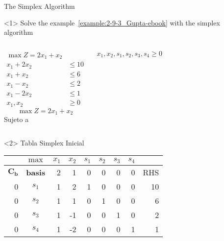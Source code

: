 \begin{frameExample}{The Simplex Algorithm}{}
  \begin{onlyenv}<1>
Solve the example~\ref{example:2-9-3_Gupta-ebook} with the simplex algorithm
  \begin{columns}
        \begin{align*}
      \max Z = 2x_1 + x_2 & \\[3mm]
    x_1 + 2x_2 & \leq 10\\
    x_1 + x_2 & \leq 6\\
    x_1 - x_2 & \leq 2\\
    x_1 - 2x_2 & \leq 1\\[5mm]
    x_1, x_2 & \geq 0
        \end{align*}
        \[ \max Z = 2x_1 + x_2 \]
      Sujeto a %

$x_1, x_2, s_1, s_2, s_3, s_4  \geq 0$
  \end{columns}
  \end{onlyenv}


\begin{onlyenv}<2>
  Tabla Simplex Inicial
  
  {\centering
\begin{tabular}{rc|rr|rrrr|r}
  &$\max$  & $x_1$ & $x_2$ & $s_1$ &$ s_2$ & $s_3$ & $s_4$ &  \\
  \toprule
  $\mathbf{C_b}$ & \textbf{basis} & 2 & 1 & 0 & 0 & 0 & 0 & RHS \\
  \midrule
0 & $s_1$ & 1 & 2 & 1 & 0 & 0 & 0 & 10 \\
0 & $s_2$ & 1 & 1 & 0 & 1 & 0 & 0 & 6 \\
0 & $s_3$ & 1 & -1 & 0 & 0 & 1 & 0 & 2 \\
  0 & $s_4$ & 1 & -2 & 0 & 0 & 0 & 1 & 1\\
  \bottomrule
\end{tabular}
  \par}
\end{onlyenv}


\end{frameExample}
